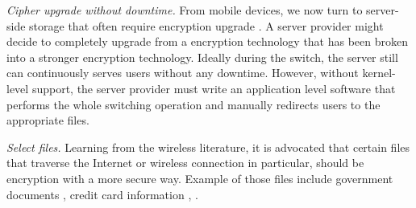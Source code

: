 {\em Cipher upgrade without downtime.} From mobile devices, we now turn to
server-side storage that often require encryption upgrade \cite{some-citations}.
A server provider might decide to completely upgrade from a encryption
technology that has been broken into a stronger encryption technology. Ideally
during the switch, the server still can continuously serves users without any
downtime. However, without kernel-level support, the server provider must write
an application level software that performs the whole switching operation and
manually redirects users to the appropriate files.

{\em Select files.} Learning from the wireless literature, it is advocated that
certain files that traverse the Internet or wireless connection in particular,
should be encryption with a more secure way. Example of those files include
government documents \cite{citation-to-this-example}, credit card information
\cite{a}, \xxx \cite{a, b, c}.

